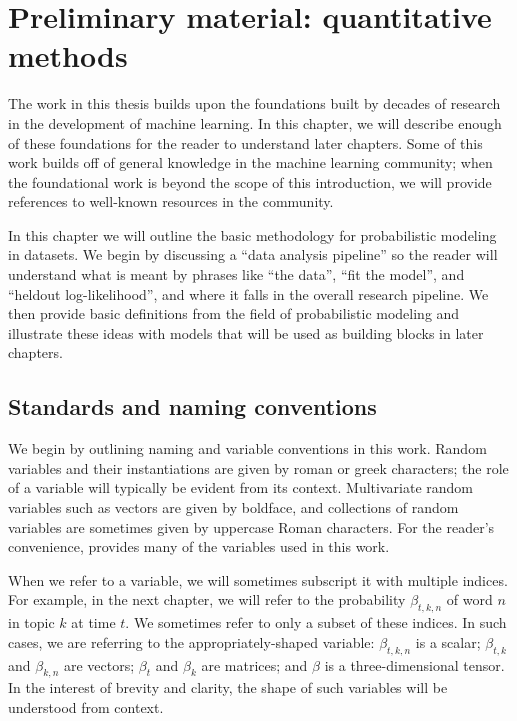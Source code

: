 \chapter{Preliminary material: quantitative methods}
\label{chapter:introductory_material}

The work in this thesis builds upon the foundations built by decades
of research in the development of machine learning.  In this chapter,
we will describe enough of these foundations for the reader to
understand later chapters. Some of this work builds off of general
knowledge in the machine learning community; when the foundational
work is beyond the scope of this introduction, we will provide
references to well-known resources in the community.

In this chapter we will outline the basic methodology for
probabilistic modeling in datasets.  We begin by discussing a ``data
analysis pipeline'' so the reader will understand what is meant by
phrases like ``the data'', ``fit the model'', and ``heldout
log-likelihood'', and where it falls in the overall research pipeline.
We then provide basic definitions from the field of probabilistic
modeling and illustrate these ideas with models that will be used as
building blocks in later chapters.

\section{Standards and naming conventions}
We begin by outlining naming and variable conventions in this work.
Random variables and their instantiations are given by roman or greek
characters; the role of a variable will typically be evident from its
context.  Multivariate random variables such as vectors are given by
boldface, and collections of random variables are sometimes given by
uppercase Roman characters.  For the reader's convenience,
 provides many of the variables used in this work.

When we refer to a variable, we will sometimes subscript it with
multiple indices.  For example, in the next chapter, we will refer to
the probability $\beta_{t,k,n}$ of word $n$ in topic $k$ at time
$t$. We sometimes refer to only a subset of these indices. In such
cases, we are referring to the appropriately-shaped variable:
$\beta_{t,k,n}$ is a scalar; $\beta_{t,k}$ and $\beta_{k,n}$ are
vectors; $\beta_t$ and $\beta_k$ are matrices; and
$\beta$ is a three-dimensional tensor.  In the interest of brevity and
clarity, the shape of such variables will be understood from context.

